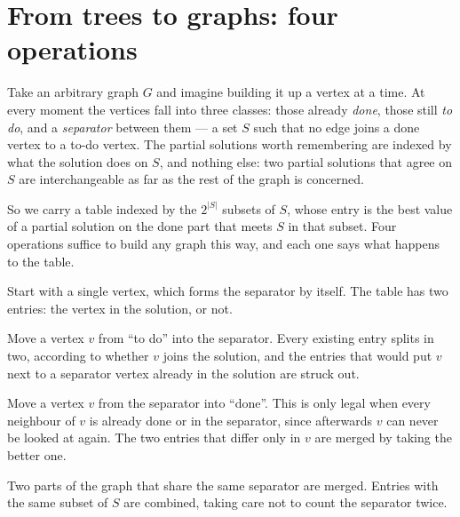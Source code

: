 \section{From trees to graphs: four operations}
\label{sec:tw-four-operations}

Take an arbitrary graph $G$ and imagine building it up a vertex at a time. At
every moment the vertices fall into three classes: those already \emph{done},
those still \emph{to do}, and a \emph{separator} between them --- a set $S$ such
that no edge joins a done vertex to a to-do vertex. The partial solutions worth
remembering are indexed by what the solution does on $S$, and nothing else:
two partial solutions that agree on $S$ are interchangeable as far as the rest
of the graph is concerned.

So we carry a table indexed by the $2^{|S|}$ subsets of $S$, whose entry is the
best value of a partial solution on the done part that meets $S$ in that
subset. Four operations suffice to build any graph this way, and each one says
what happens to the table.

\begin{description}[leftmargin=1.2em,style=nextline]
  \item[New graph (leaf).] Start with a single vertex, which forms the
        separator by itself. The table has two entries: the vertex in the
        solution, or not.
  \item[Introduce a vertex.] Move a vertex $v$ from ``to do'' into the
        separator. Every existing entry splits in two, according to whether $v$
        joins the solution, and the entries that would put $v$ next to a
        separator vertex already in the solution are struck out.
  \item[Forget a vertex.] Move a vertex $v$ from the separator into ``done''.
        This is only legal when every neighbour of $v$ is already done or in the
        separator, since afterwards $v$ can never be looked at again. The two
        entries that differ only in $v$ are merged by taking the better one.
  \item[Join.] Two parts of the graph that share the same separator are merged.
        Entries with the same subset of $S$ are combined, taking care not to
        count the separator twice.
\end{description}

